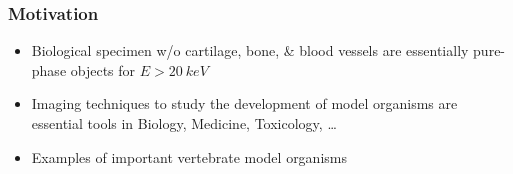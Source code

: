 \documentclass{beamer}
\begin{document}
\begin{frame}
  \frametitle{Motivation}
  \begin{itemize}
  \item Biological specimen w/o cartilage, bone, \& blood vessels are
    essentially pure-phase objects for $E>\SI{20}{keV}$
  \item Imaging techniques to study the development of model organisms
    are essential tools in Biology, Medicine, Toxicology, …
    \item Examples of important vertebrate model organisms
\end{itemize}
\end{frame}
\end{document}
